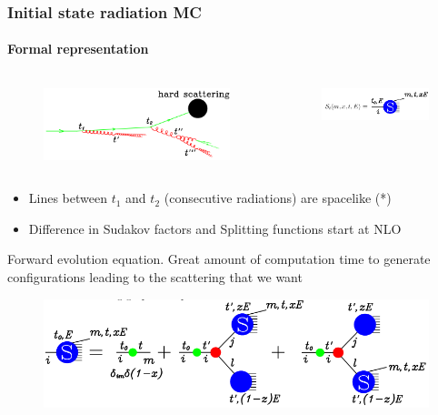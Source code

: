 \documentclass[aspectratio=43]{beamer}
\begin{document}
\begin{frame}
	
	\frametitle{Initial state radiation MC}
	\framesubtitle{Formal representation}
	
	\begin{columns}

	
		\begin{figure}
			\includegraphics[width = 4 cm]{plots/ISR_shower_1a.png}
		\end{figure}
	

		\begin{figure}
			\includegraphics[width = 4 cm]{plots/ISR_shower_1b.png}
		\end{figure}
			
	\end{columns}

	\begin{itemize} 
		\item \footnotesize Lines between $t_{1}$ and $t_{2}$ (consecutive radiations) are spacelike {\color{blue}(*)}
		\item \footnotesize Difference in Sudakov factors and Splitting functions start at NLO
	\end{itemize}
	
	\footnotesize Forward evolution equation. Great amount of computation time to generate configurations leading to the scattering that we want
	\begin{figure}
		\includegraphics[width = 8.5 cm]{plots/ISR_shower_2.png}
	\end{figure}

\end{frame}
\end{document}
